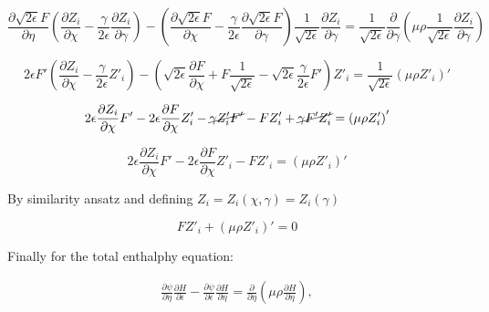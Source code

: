 \begin{equation*} 
\frac{\partial \sqrt{2\epsilon}F}{\partial \eta}
\left(
    \frac{\partial Z_{i}}{\partial \chi}
    -
    \frac{\gamma}{2\epsilon}
    \frac{\partial Z_{i}}{\partial \gamma}
\right)
-
\left(
    \frac{\partial \sqrt{2\epsilon}F}{\partial \chi}
    -
    \frac{\gamma}{2\epsilon}
    \frac{\partial \sqrt{2\epsilon}F}{\partial \gamma}
\right)
\frac{1}{\sqrt{2\epsilon}}
\frac{\partial Z_{i}}{\partial \gamma}
=
\frac{1}{\sqrt{2\epsilon}}
\frac{\partial }{\partial \gamma}
\left(\mu\rho  
\frac{1}{\sqrt{2\epsilon}}
\frac{\partial Z_i}{\partial \gamma}
\right)
\end{equation*} 

\begin{equation*} 
2\epsilon
F'
\left(
    \frac{\partial Z_{i}}{\partial \chi}
    -
    \frac{\gamma}{2\epsilon}
    Z'_i
\right)
-
\left(
    \sqrt{2\epsilon}
    \frac{\partial F}{\partial \chi}
    +
    F
    \frac{1}{\sqrt{2\epsilon}}
    -
    \sqrt{2\epsilon}
    \frac{\gamma}{2\epsilon}
    F'
\right)
Z'_i
=
\frac{1}{\sqrt{2\epsilon}}
\left(\mu\rho  
Z'_i
\right)'
\end{equation*} 

\begin{equation*} 
2\epsilon
\frac{\partial Z_{i}}{\partial \chi}
F'
-
2\epsilon
\frac{\partial F}{\partial \chi}
Z'_i
-
\cancel{
\gamma
Z'_i
F'
}
-
F
Z'_i
+
\cancel{
\gamma
F'
Z'_i
}
=
\left(\mu\rho  
Z'_i
\right)'
\end{equation*} 

\begin{equation} 
2\epsilon
\frac{\partial Z_{i}}{\partial \chi}
F'
-
2\epsilon
\frac{\partial F}{\partial \chi}
Z'_i
-
F
Z'_i
=
\left(\mu\rho  
Z'_i
\right)'
\end{equation} 

By similarity ansatz and defining $Z_i=Z_i(\chi,\gamma)=Z_i(\gamma)$

\begin{equation} 
F
Z'_i
+
\left(\mu\rho  
Z'_i
\right)'=0
\end{equation} 

Finally for the total enthalphy equation:

\begin{equation} 
\begin{split} 
\frac{\partial \psi}{\partial \eta}
\frac{\partial H}{\partial \epsilon}
-
\frac{\partial \psi}{\partial \epsilon}
\frac{\partial H}{\partial \eta}
=
\frac{\partial}{\partial \eta}
    \left(
    \mu
    \rho
        \frac{\partial H}{\partial \eta}
    \right)
    ,
\end{split} 
\end{equation} 


